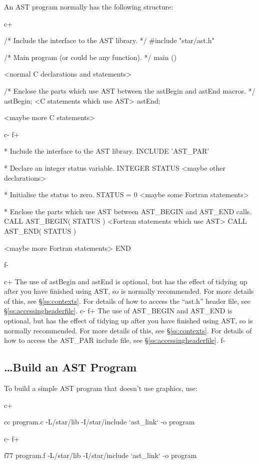\documentclass[twoside,11pt]{starlink}
\providecommand{\secref}[1]{\S\ref{#1}}
\begin{document}
An AST program normally has the following structure:

c+
\begin{small}
\begin{terminalv}
/* Include the interface to the AST library. */
#include "star/ast.h"

/* Main program (or could be any function). */
main () {
   <normal C declarations and statements>

/* Enclose the parts which use AST between the astBegin and astEnd macros. */
   astBegin;
   <C statements which use AST>
   astEnd;

   <maybe more C statements>
}
\end{terminalv}
\end{small}
c-
f+
\small
\begin{terminalv}
*  Include the interface to the AST library.
      INCLUDE 'AST_PAR'

*  Declare an integer status variable.
      INTEGER STATUS
      <maybe other declarations>

*  Initialise the status to zero.
      STATUS = 0
      <maybe some Fortran statements>

*  Enclose the parts which use AST between AST_BEGIN and AST_END calls.
      CALL AST_BEGIN( STATUS )
      <Fortran statements which use AST>
      CALL AST_END( STATUS )

      <maybe more Fortran statements>
      END
\end{terminalv}
\normalsize
f-

c+
The use of astBegin and astEnd is optional, but has the effect of
tidying up after you have finished using AST, so is normally
recommended. For more details of this, see \secref{ss:contexts}. For
details of how to access the ``ast.h'' header file, see
\secref{ss:accessingheaderfile}.
c-
f+
The use of AST\_BEGIN and AST\_END is optional, but has the effect of
tidying up after you have finished using AST, so is normally
recommended. For more details of this, see \secref{ss:contexts}. For
details of how to access the AST\_PAR include file, see
\secref{ss:accessingheaderfile}.
f-

\subsection{\label{ss:howtobuild}\ldots Build an AST Program}

To build a simple AST program that doesn't use graphics, use:

c+
\begin{small}
\begin{terminalv}
cc program.c -L/star/lib -I/star/include `ast_link` -o program
\end{terminalv}
\end{small}
c-
f+
\begin{small}
\begin{terminalv}
f77 program.f -L/star/lib -I/star/include `ast_link` -o program
\end{terminalv}
\end{small}
\end{document}
